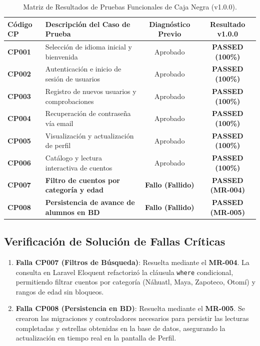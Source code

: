 \documentclass[12pt]{article}
\begin{document}
\begin{table}[H]
    \centering
    \caption{Matriz de Resultados de Pruebas Funcionales de Caja Negra (v1.0.0).}
    \label{tab:functional_tests}
    \small
    \color{black}
    \begin{tabularx}{\textwidth}{lXcc}
        \toprule
        \textbf{Código CP} & \textbf{Descripción del Caso de Prueba} & \textbf{Diagnóstico Previo} & \textbf{Resultado v1.0.0} \\
        \midrule
        \textbf{CP001} & Selección de idioma inicial y bienvenida & Aprobado & \textbf{PASSED (100\%)} \\
        \rowcolor{darkcard}
        \textbf{CP002} & Autenticación e inicio de sesión de usuarios & Aprobado & \textbf{PASSED (100\%)} \\
        \textbf{CP003} & Registro de nuevos usuarios y comprobaciones & Aprobado & \textbf{PASSED (100\%)} \\
        \rowcolor{darkcard}
        \textbf{CP004} & Recuperación de contraseña vía email & Aprobado & \textbf{PASSED (100\%)} \\
        \textbf{CP005} & Visualización y actualización de perfil & Aprobado & \textbf{PASSED (100\%)} \\
        \rowcolor{darkcard}
        \textbf{CP006} & Catálogo y lectura interactiva de cuentos & Aprobado & \textbf{PASSED (100\%)} \\
        \textbf{CP007} & \textbf{Filtro de cuentos por categoría y edad} & \textbf{Fallo (Fallido)} & \textbf{PASSED (MR-004)} \\
        \rowcolor{darkcard}
        \textbf{CP008} & \textbf{Persistencia de avance de alumnos en BD} & \textbf{Fallo (Fallido)} & \textbf{PASSED (MR-005)} \\
        \bottomrule
    \end{tabularx}
\end{table}

\vspace{1.5em}
\subsection{Verificación de Solución de Fallas Críticas}
\begin{enumerate}
    \item \textbf{Falla CP007 (Filtros de Búsqueda)}: Resuelta mediante el \textbf{MR-004}. La consulta en Laravel Eloquent refactorizó la cláusula \texttt{where} condicional, permitiendo filtrar cuentos por categoría (Náhuatl, Maya, Zapoteco, Otomí) y rangos de edad sin bloqueos.
    \item \textbf{Falla CP008 (Persistencia en BD)}: Resuelta mediante el \textbf{MR-005}. Se crearon las migraciones y controladores necesarios para persistir las lecturas completadas y estrellas obtenidas en la base de datos, asegurando la actualización en tiempo real en la pantalla de Perfil.
\end{enumerate}
\end{document}

